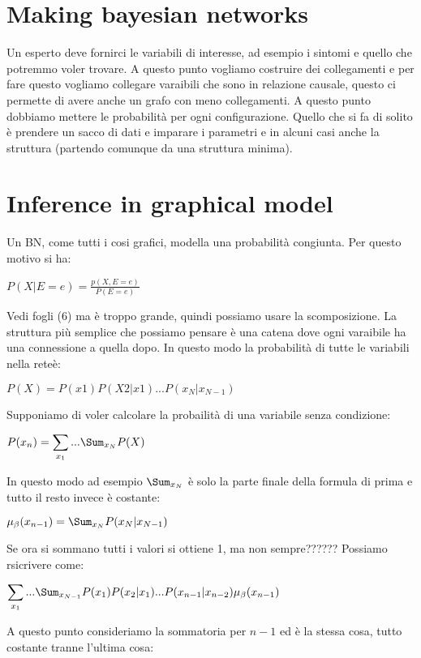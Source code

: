 \section{Making bayesian networks}
Un esperto deve fornirci le variabili di interesse, ad esempio i sintomi e quello che potremmo voler trovare. A questo punto vogliamo costruire dei collegamenti e per fare questo vogliamo collegare varaibili che sono in relazione causale, questo ci permette di avere anche un grafo con meno collegamenti. A questo punto dobbiamo mettere le probabilità per ogni configurazione. \newline
Quello che si fa di solito è prendere un sacco di dati e imparare i parametri e in alcuni casi anche la struttura (partendo comunque da una struttura minima).
\section{Inference in graphical model}
Un BN, come tutti i cosi grafici, modella una probabilità congiunta. Per questo motivo si ha:
\begin{center}
	$\displaystyle P(X\vert E=e)=\frac{p(X,E=e)}{P(E=e)}$
\end{center}
Vedi fogli \ins(6) ma è troppo grande, quindi possiamo usare la scomposizione. La struttura più semplice che possiamo pensare è una catena dove ogni varaibile ha una connessione a quella dopo. In questo modo la probabilità di tutte le variabili nella reteè:
\begin{center}
	$\displaystyle P(X)=P(x1)P(X2\vert x1)...P(x_{N}\vert x_{N-1})$
\end{center}
Supponiamo di voler calcolare la probailità di una variabile senza condizione:
\begin{center}
	$\displaystyle P(x_n)=\sum_{x_1}...\Sum_{x_N}P(X)$
\end{center}
In questo modo ad esempio $\Sum_{x_N}$ è solo la parte finale della formula di prima e tutto il resto invece è costante:
\begin{center}
	$\displaystyle \mu_\beta(x_{n-1})=\Sum_{x_N}P(x_N\vert x_{N-1})$
\end{center}
Se ora si sommano tutti i valori si ottiene 1, ma non sempre??????\newline
Possiamo rsicrivere come: 
\begin{center}
	$\displaystyle \sum_{x_1}...\Sum_{x_{N-1}}P(x_1)P(x_2\vert x_1)...P(x_{n-1}\vert x_{n-2})\mu_\beta(x_{n-1})$
\end{center}
A questo punto consideriamo la sommatoria per $n-1$ ed è la stessa cosa, tutto costante tranne l'ultima cosa:
